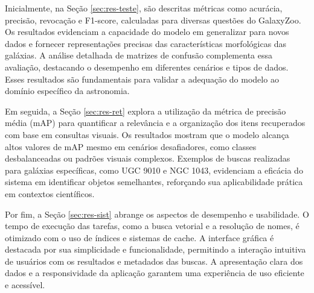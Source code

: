 Inicialmente, na Seção \ref{sec:res-teste}, são descritas métricas como acurácia, precisão, revocação e F1-score, calculadas para diversas questões do GalaxyZoo. Os resultados evidenciam a capacidade do modelo em generalizar para novos dados e fornecer representações precisas das características morfológicas das galáxias. A análise detalhada de matrizes de confusão complementa essa avaliação, destacando o desempenho em diferentes cenários e tipos de dados. Esses resultados são fundamentais para validar a adequação do modelo ao domínio específico da astronomia.

Em seguida, a Seção \ref{sec:res-ret} explora a utilização da métrica de precisão média (mAP) para quantificar a relevância e a organização dos itens recuperados com base em consultas visuais. Os resultados mostram que o modelo alcança altos valores de mAP mesmo em cenários desafiadores, como classes desbalanceadas ou padrões visuais complexos. Exemplos de buscas realizadas para galáxias específicas, como UGC 9010 e NGC 1043, evidenciam a eficácia do sistema em identificar objetos semelhantes, reforçando sua aplicabilidade prática em contextos científicos.

Por fim, a Seção \ref{sec:res-sist} abrange os aspectos de desempenho e usabilidade. O tempo de execução das tarefas, como a busca vetorial e a resolução de nomes, é otimizado com o uso de índices e sistemas de cache. A interface gráfica é destacada por sua simplicidade e funcionalidade, permitindo a interação intuitiva de usuários com os resultados e metadados das buscas. A apresentação clara dos dados e a responsividade da aplicação garantem uma experiência de uso eficiente e acessível.

\chaptersep
